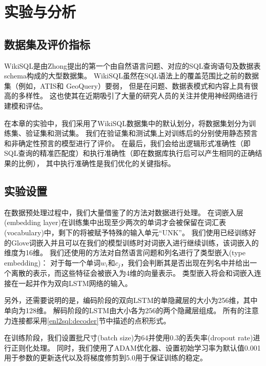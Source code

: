 \section{实验与分析}
\subsection{数据集及评价指标}
WikiSQL是由Zhong\cite{zhong2017seq2sql}提出的第一个由自然语言问题、对应的SQL查询语句及数据表schema构成的大型数据集。
WikiSQL虽然在SQL语法上的覆盖范围比之前的数据集（例如，ATIS\cite{price1990evaluation,Dahl1994Expanding}和 GeoQuery\cite{Zelle2008Learning}）要弱，
但是在问题、数据表模式和内容上具有很高的多样性。
这也使其在近期吸引了大量的研究人员的关注并使用神经网络进行建模和评估\cite{zhong2017seq2sql,dong2016language,xu2017sqlnet,yu2018typesql,wang2018pointing,huang2018natural,wang2018execution}。

在本章的实验中，我们采用了WikiSQL数据集中的默认划分，将数据集划分为训练集、验证集和测试集。
我们在验证集和测试集上对训练后的分别使用静态预言和非确定性预言的模型进行了评价。
在最后，我们会给出逻辑形式准确性（即SQL查询的精准匹配度）和执行准确性（即在数据库执行后可以产生相同的正确结果的比例），
其中执行准确性是我们优化的关键指标。


\subsection{实验设置}
在数据预处理过程中，我们大量借鉴了\cite{dong2018coarse}的方法对数据进行处理。
在词嵌入层(embedding layer)在训练集中出现至少两次的单词才会被保留在词汇表(vocabulary)中，剩下的将被赋予特殊的输入单元“UNK”。
我们使用已经训练好的Glove词嵌入\cite{pennington2014glove}并且可以在我们的模型训练时对词嵌入进行继续训练，该词嵌入的维度为16维。
我们还使用\cite{yu2018typesql}的方法对自然语言问题和列名进行了类型嵌入(type embedding)：
对于每一个单词$w_i$和$c_j$，我们会判断其是否出现在列名中并给出一个离散的表示，而这些特征会被嵌入为4维的向量表示。
类型嵌入将会和词嵌入连接在一起并作为双向LSTM网络的输入。

另外，还需要说明的是，编码阶段的双向LSTM的单隐藏层的大小为256维，其中单向为128维。
解码阶段的LSTM由大小各为256的两个隐藏层组成。
所有的注意力连接都采用\ref{enl2sql:decoder}节中描述的点积形式。

在训练阶段，我们设置批尺寸(batch size)为64并使用0.3的丢失率(dropout rate)进行正则化处理。
同时，我们使用了ADAM优化器\cite{kingma2014adam}、设置初始学习率为默认值0.001用于参数的更新迭代以及将梯度修剪到5.0用于保证训练的稳定。


